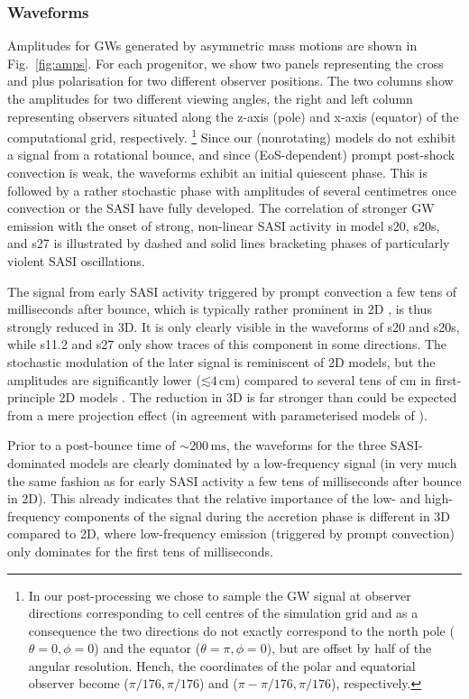 \subsubsection{Waveforms}
\label{sec:waveforms}
Amplitudes for GWs generated by asymmetric mass motions are shown in
Fig.~\ref{fig:amps}. For each progenitor, we show two panels
representing the cross and plus polarisation for two different
observer positions. The two columns show the amplitudes for two 
different viewing angles, the right and left column representing
observers situated along the z-axis (pole) and x-axis (equator) of the computational grid, respectively.
\footnote{In our post-processing we chose to sample the GW signal at observer directions corresponding to 
cell centres of the simulation grid and as a consequence the two directions do not exactly correspond to the
north pole ($\theta = 0, \phi = 0$) and the equator ($\theta = \pi, \phi = 0$), but are offset by half of the angular resolution.
Hench, the coordinates of the polar and equatorial observer become ($\pi/176,\pi/176$) 
and ($\pi - \pi/176,\pi/176$), respectively.}
Since our (nonrotating) models do not exhibit a signal from a rotational bounce,
and since (EoS-dependent) prompt post-shock convection is weak, 
the waveforms exhibit an initial quiescent phase. This is followed by a rather 
stochastic phase with amplitudes of several centimetres once convection or the SASI have fully developed. 
The correlation of stronger GW emission
with the onset of strong, non-linear SASI activity
in model s20, s20s, and s27 is illustrated
by dashed and solid lines bracketing phases of particularly
violent SASI oscillations.

The signal from early SASI activity triggered by prompt convection a
few tens of milliseconds after bounce, which is typically rather
prominent in 2D
\citep{marek_08,murphy_08,yakunin_10,mueller_13,yakunin_15},
is thus strongly reduced in 3D. It is only clearly visible in
the waveforms of s20 and s20s, while s11.2 and s27 only show traces
of this component in some directions. 
The stochastic modulation of the later signal is reminiscent
of 2D models, but the amplitudes are significantly lower ($\mathord{\lesssim} 4
\, \mathrm{cm}$) compared to several tens of $\mathrm{cm}$ in first-principle 2D
models \citep{marek_08,yakunin_10,mueller_13,yakunin_15}. The
reduction in 3D is far stronger than could be expected from a mere
projection effect (in agreement with parameterised models of
\citealt{mueller_e_12}).

Prior to a post-bounce time of $\mathord{\sim} 200 \, \mathrm{ms}$,
the waveforms for the three SASI-dominated models
are clearly dominated by a low-frequency signal
(in very much the same fashion as for early SASI activity
a few tens of milliseconds after bounce in 2D). This already indicates
that the relative importance of the low- and high-frequency
components of the signal during the accretion phase is different
in 3D compared to 2D,  where low-frequency
emission (triggered by prompt convection) only dominates for the first tens
of milliseconds. 

